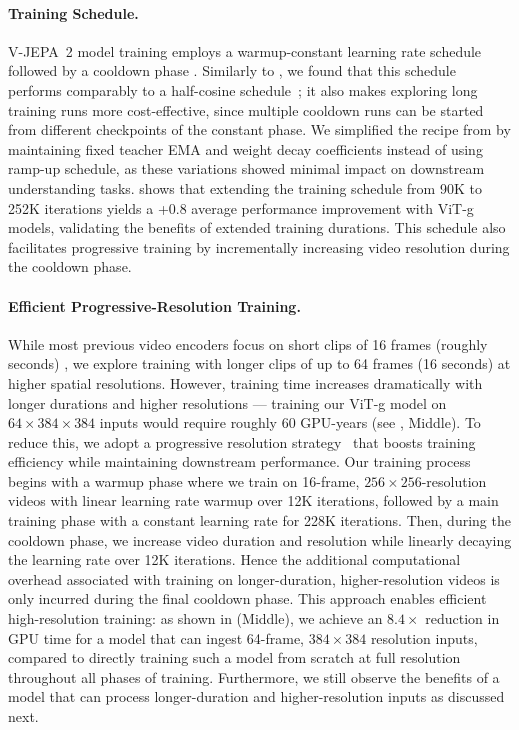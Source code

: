 \documentclass[]{fairmeta}
\newcommand{\model}{V-JEPA~2\xspace}
\begin{document}
\paragraph{\bf Training Schedule.}
\model model training employs a warmup-constant learning rate schedule followed by a cooldown phase \citep{zhai2022scaling, hagele2024scaling}. Similarly to \citet{hagele2024scaling}, we found that this schedule performs comparably to a half-cosine schedule~\citep{loshchilov2016sgdr}; it also makes exploring long training runs more cost-effective, since multiple cooldown runs can be started from different checkpoints of the constant phase.
We simplified the recipe from \citet{bardes2024revisiting} by maintaining fixed teacher EMA and weight decay coefficients instead of using ramp-up schedule, as these variations showed minimal impact on downstream understanding tasks.  shows that extending the training schedule from 90K to 252K iterations yields a +0.8 average performance improvement with ViT-g models, validating the benefits of extended training durations. This schedule also facilitates progressive training by incrementally increasing video resolution during the cooldown phase.


\paragraph{\bf Efficient Progressive-Resolution Training.}
While most previous video encoders focus on short clips of 16 frames (roughly seconds) \citep{bardes2024revisiting, wang2024internvideo2, wang2023videomae}, we explore training with longer clips of up to 64 frames (16 seconds) at higher spatial resolutions. However, training time increases dramatically with longer durations and higher resolutions --- training our ViT-g model on $64\times384\times384$ inputs would require roughly $60$ GPU-years (see , Middle).
To reduce this, we adopt a progressive resolution strategy~\citep{touvron2019fixing, oquab2023dinov2} that boosts training efficiency while maintaining downstream performance. Our training process begins with a warmup phase where we train on 16-frame, $256\times256$-resolution videos with linear learning rate warmup over 12K iterations, followed by a main training phase with a constant learning rate for 228K iterations. Then, during the cooldown phase, we increase video duration and resolution while linearly decaying the learning rate over 12K iterations. Hence the additional computational overhead associated with training on longer-duration, higher-resolution videos is only incurred during the final cooldown phase. 
This approach enables efficient high-resolution training: as shown in  (Middle), we achieve an $8.4\times$ reduction in GPU time for a model that can ingest 64-frame, $384\times384$ resolution inputs, compared to directly training such a model from scratch at full resolution throughout all phases of training. Furthermore, we still observe the benefits of a model that can process longer-duration and higher-resolution inputs as discussed next.
\end{document}
